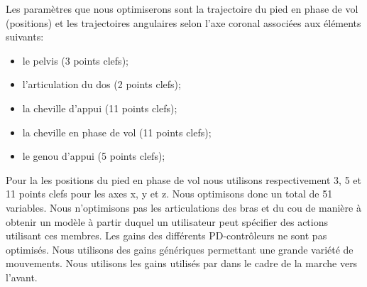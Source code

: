 \documentclass[runningheads,a4paper]{llncs}
\begin{document}
Les paramètres que nous optimiserons sont la trajectoire du pied en phase de vol (positions) et les trajectoires angulaires selon l'axe coronal associées aux éléments suivants:
\begin{itemize}
\item{le pelvis (3 points clefs);}
\item{l'articulation du dos (2 points clefs);}
\item{la cheville d'appui (11 points clefs);}
\item{la cheville en phase de vol (11 points clefs);}
\item{le genou d'appui (5 points clefs);}
\end{itemize}
Pour la les positions du pied en phase de vol nous utilisons respectivement 3, 5 et 11 points clefs pour les axes x, y et z. Nous optimisons donc un total de 51 variables.
Nous n'optimisons pas les articulations des bras et du cou de manière à obtenir un modèle à partir duquel un utilisateur peut spécifier des actions utilisant ces membres. Les gains des différents PD-contrôleurs ne sont pas optimisés. Nous utilisons des gains génériques permettant une grande variété de mouvements. Nous utilisons les gains utilisés par \cite{yin2007simbicon} dans le cadre de la marche vers l'avant.

%
\end{document}
